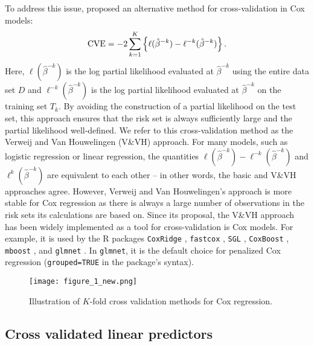 To address this issue, \citet{Verweij1993} proposed an alternative method for cross-validation in Cox models:
\begin{equation}
  \label{eq:VVH}
  \textrm{CVE} = -2\sum_{k = 1}^K \left\{ \ell(\hat{\beta}^{- k})  - \ell^{-k}(\hat{\beta}^{- k}) \right\}. 
\end{equation}
Here, $\ell(\hat{\beta}^{-k})$ is the log partial likelihood evaluated at $\hat{\beta}^{-k}$ using the entire data set $D$ and $\ell^{-k}(\hat{\beta}^{-k})$ is the log partial likelihood evaluated at $\hat{\beta}^{-k}$ on
the training set $T_k$. By avoiding the construction of a partial likelihood on the test set, this approach ensures that the risk set is always sufficiently large and the partial likelihood well-defined.  We refer to this cross-validation method as the Verweij and Van Houwelingen (V\&VH) approach. For many models, such as logistic regression or linear regression, the quantities $\ell(\hat{\beta}^{- k})  - \ell^{-k}(\hat{\beta}^{- k})$ and  $\ell^{k}(\hat{\beta}^{-k})$ are equivalent to each other -- in other words, the basic and V\&VH approaches agree.  However, Verweij and Van Houwelingen's approach is more stable for Cox regression as there is always a large number of observations in the risk sets its calculations are based on.  Since its proposal, the V\&VH approach has been widely implemented as a tool for cross-validation is Cox models.  For example, it is used by the R packages {\tt CoxRidge} \citep{CoxRidge}, {\tt fastcox} \citep{fastcox}, {\tt SGL} \citep{SGL} , {\tt CoxBoost} \citep{CoxBoost}, {\tt mboost} \citep{mboost}, and {\tt glmnet} \citep{glmnet}.  In {\tt glmnet}, it is the default choice for penalized Cox regression (\texttt{grouped=TRUE} in the package's syntax).

\begin{figure}
  \centering
  \texttt{[image: figure\_1\_new.png]}
  \caption{\label{Fig:methods} Illustration of $K$-fold cross validation methods for Cox regression.}
\end{figure}	

\subsection{Cross validated linear predictors}
\label{Sec:linear-predictor}


